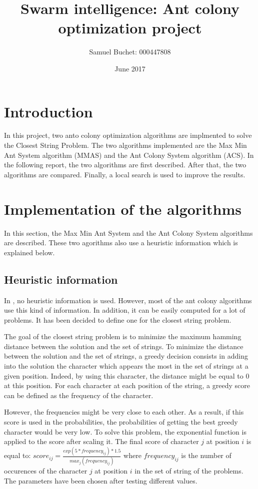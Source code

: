 \documentclass{article}
\title{Swarm intelligence: Ant colony optimization project}
\author{Samuel Buchet: 000447808}
\date{June 2017}
\begin{document}
\maketitle

\section*{Introduction}

In this project, two anto colony optimization algorithms are implmented to solve the Closest String Problem.
The two algorithms implemented are the Max Min Ant System algorithm (MMAS) and the Ant Colony System algorithm (ACS).
In the following report, the two algorithms are first described.
After that, the two algorithms are compared.
Finally, a local search is used to improve the results.

\section{Implementation of the algorithms}

In this section, the Max Min Ant System and the Ant Colony System algorithms are described.
These two agorithms also use a heuristic information which is explained below.

\subsection{Heuristic information}

In \cite{aco_csp}, no heuristic information is used.
However, most of the ant colony algorithms use this kind of information.
In addition, it can be easily computed for a lot of problems.
It has been decided to define one for the closest string problem. \newline

The goal of the closest string problem is to minimize the maximum hamming distance between the solution and the set of strings.
To minimize the distance between the solution and the set of strings, a greedy decision consists in adding into the solution the character which appears the most in the set of strings at a given position.
Indeed, by using this character, the distance might be equal to 0 at this position.
For each character at each position of the string, a greedy score can be defined as the frequency of the character.\newline

However, the frequencies might be very close to each other.
As a result, if this score is used in the probabilities, the probabilities of getting the best greedy character would be very low.
To solve this problem, the exponential function is applied to the score after scaling it.
The final score of character $j$ at position $i$ is equal to: $score_{ij} = \frac{exp(5*frequency_{ij})*1.5}{max_j(frequency_{ij})}$ where $frequency_{ij}$ is the number of occurences of the character $j$ at position $i$ in the set of string of the problems.
The parameters have been chosen after testing different values.
\end{document}
